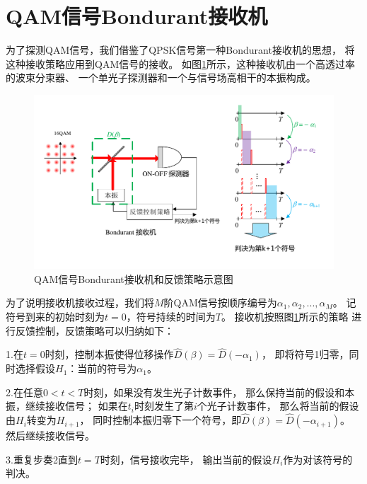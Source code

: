 \section{QAM信号Bondurant接收机}
为了探测QAM信号，我们借鉴了QPSK信号第一种Bondurant接收机的思想，
将这种接收策略应用到QAM信号的接收。
如图\ref{fig:QAM-Bondurant-receiver}所示，这种接收机由一个高透过率的波束分束器、
一个单光子探测器和一个与信号场高相干的本振构成。

\begin{figure}
\centering
  \includegraphics[width=\textwidth]{figures/chap3/Bondurant-receiver}
  \caption{QAM信号Bondurant接收机和反馈策略示意图}
  \label{fig:QAM-Bondurant-receiver}
\end{figure}

为了说明接收机接收过程，我们将$M$阶QAM信号按顺序编号为$\alpha_1,\alpha_2,...,\alpha_M$。
记符号到来的初始时刻为$t=0$，符号持续的时间为$T$。
接收机按照图\ref{fig:QAM-Bondurant-receiver}所示的策略
进行反馈控制，反馈策略可以归纳如下：

1.在$t=0$时刻，控制本振使得位移操作$\hat{D}(\beta) = \hat{D}(-\alpha_1)$，
  即将符号1归零，同时选择假设$H_1$：当前的符号为$\alpha_1$。
  
2.在任意$0<t<T$时刻，如果没有发生光子计数事件，
  那么保持当前的假设和本振，继续接收信号；
  如果在$t_i$时刻发生了第$i$个光子计数事件，
  那么将当前的假设由$H_i$转变为$H_{i+1}$，
  同时控制本振归零下一个符号，即$\hat{D}(\beta) = \hat{D}(-\alpha_{i+1})$。
  然后继续接收信号。
  
3.重复步奏2直到$t=T$时刻，信号接收完毕，
  输出当前的假设$H_i$作为对该符号的判决。
  
